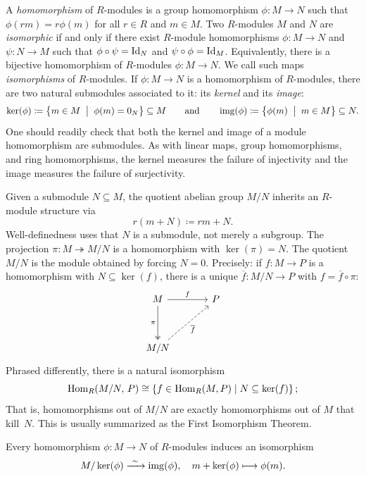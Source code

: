 \documentclass[12pt,reqno]{amsart}
\begin{document}
\hrulefill

A \emph{homomorphism} of $R$-modules is a group homomorphism $\phi:M \to N$ such that $\phi(rm)=r\phi(m)$ for all $r\in R$ and $m\in M$. Two $R$-modules $M$ and $N$ are \emph{isomorphic} if and only if there exist $R$-module homomorphisms $\phi:M \to N$ and $\psi:N\to M$ such that $\phi\circ \psi = \operatorname{Id}_{N}$ and $\psi\circ \phi=\operatorname{Id}_{M}$. Equivalently, there is a bijective homomorphism of $R$-modules $\phi:M\to N$. We call such maps \emph{isomorphisms} of $R$-modules.  If $\phi:M \to N$ is a homomorphism of $R$-modules, there are two natural submodules associated to it: its \emph{kernel} and its \emph{image}:
\[
\ker(\phi) \coloneqq \left\{ m \in M \;\; \big| \;\; \phi(m)=0_{N} \right\}\subseteq M \quad \quad \text{and} \quad \quad \operatorname{img}(\phi) \coloneqq \left\{ \phi(m) \;\; \big| \;\; m \in M\right\} \subseteq N.
\]
One should readily check that both the kernel and image of a module homomorphism are submodules. As with linear maps, group homomorphisms, and ring homomorphisms, the kernel measures the failure of injectivity and the image measures the failure of surjectivity.

Given a submodule $N \subseteq M$, the quotient abelian group $M/N$ inherits an $R$-module structure via
\[
  r(m+N) \coloneqq rm + N.
\]
Well-definedness uses that $N$ is a submodule, not merely a subgroup. The projection $\pi \colon M \twoheadrightarrow M/N$ is a homomorphism with $\ker(\pi) = N$. The quotient $M/N$ is the module obtained by forcing $N = 0$.  Precisely: if $f \colon M \to P$ is a homomorphism with $N \subseteq \ker(f)$, there is a unique $\overline{f} \colon M/N \to P$ with $f = \overline{f} \circ \pi$:
\[
\begin{tikzcd}[row sep = 3.5em, column sep = 3.5em]
  M \arrow[r,"f"] \arrow[d,two heads,"\pi"'] & P \\
  M/N \arrow[ur,dashed,"\overline{f}"'] &
\end{tikzcd}
\]
Phrased differently, there is a natural isomorphism 
\[
\operatorname{Hom}_R(M/N,\, P) \cong \left\{ f \in \operatorname{Hom}_R(M,P) \mid N \subseteq \ker(f) \right\};
\] 
That is, homomorphisms out of $M/N$ are exactly homomorphisms out of $M$ that kill~$N$. This is usually summarized as the First Isomorphism Theorem. 
  
\begin{theorem}
  Every homomorphism $\phi \colon M \to N$ of $R$-modules induces an isomorphism
  \[
    M/\ker(\phi) \xrightarrow{\ \sim\ } \operatorname{img}(\phi), \quad m + \ker(\phi) \longmapsto \phi(m).
  \]
\end{theorem}
 
\end{document}
